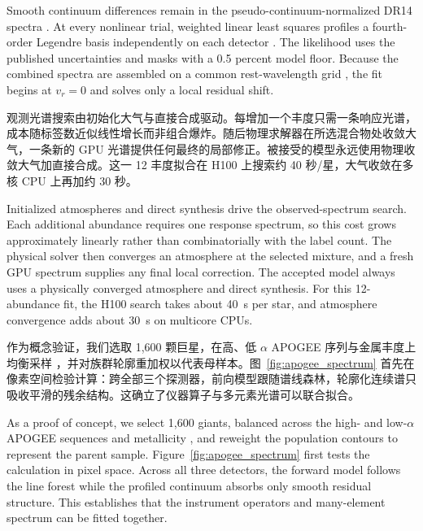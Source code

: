 \begin{EN}
Smooth continuum differences remain in the pseudo-continuum-normalized DR14
spectra \citep{Holtzman2018}. At every nonlinear trial, weighted linear least
squares profiles a fourth-order Legendre basis independently on each detector
\citep{GolubPereyra2003}. The likelihood uses the published uncertainties and
masks \citep{Holtzman2018} with a 0.5 percent model floor.
Because the combined spectra are assembled on a common rest-wavelength grid
\citep{Nidever2015}, the fit begins at $v_r=0$ and solves only a local
residual shift.
\end{EN}

观测光谱搜索由初始化大气与直接合成驱动。每增加一个丰度只需一条响应光谱，成本随标签数近似线性增长而非组合爆炸。随后物理求解器在所选混合物处收敛大气，一条新的 GPU 光谱提供任何最终的局部修正。被接受的模型永远使用物理收敛大气加直接合成。这一 12 丰度拟合在 H100 上搜索约 40 秒/星，大气收敛在多核 CPU 上再加约 30 秒。

\begin{EN}
Initialized atmospheres and direct synthesis drive the observed-spectrum
search.
Each additional abundance requires one response spectrum, so this cost grows
approximately linearly rather than combinatorially with the label count. The
physical solver then converges an atmosphere at the selected mixture, and a
fresh GPU spectrum supplies any final local correction. The accepted model
always uses a physically converged atmosphere and direct synthesis. For this
12-abundance fit, the H100 search takes about 40~s per star, and atmosphere
convergence adds about 30~s on multicore CPUs.
\end{EN}

作为概念验证，我们选取 1,600 颗巨星，在高、低 $\alpha$ APOGEE 序列与金属丰度上均衡采样 \citep{Nidever2014,Hayden2015}，并对族群轮廓重加权以代表母样本。图~\ref{fig:apogee_spectrum} 首先在像素空间检验计算：跨全部三个探测器，前向模型跟随谱线森林，轮廓化连续谱只吸收平滑的残余结构。这确立了仪器算子与多元素光谱可以联合拟合。

\begin{EN}
As a proof of concept, we select 1,600 giants, balanced across the high- and
low-$\alpha$ APOGEE sequences and metallicity
\citep{Nidever2014,Hayden2015}, and reweight the population contours to
represent the parent sample. Figure~\ref{fig:apogee_spectrum} first tests the
calculation in pixel space.
Across all three detectors, the forward model follows the line forest while the
profiled continuum absorbs only smooth residual structure. This establishes
that the instrument operators and many-element spectrum can be fitted together.
\end{EN}

